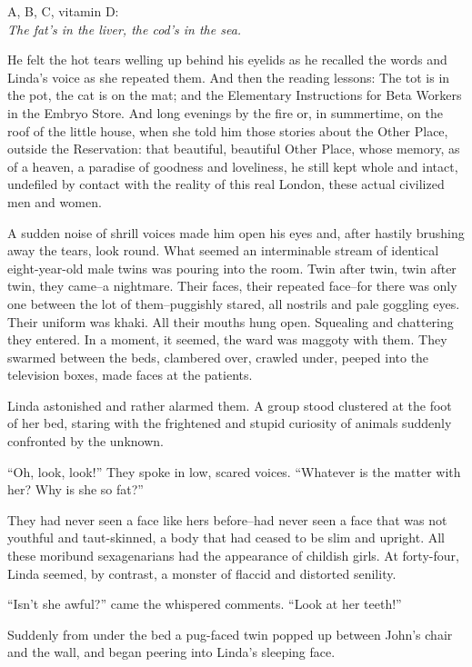 \documentclass[12pt]{report}
\begin{document}
\emph{}

A, B, C, vitamin D:\\

\emph{The fat's in the liver, the cod's in the sea.\\
}

He felt the hot tears welling up behind his eyelids as he recalled the
words and Linda's voice as she repeated them. And then the reading
lessons: The tot is in the pot, the cat is on the mat; and the
Elementary Instructions for Beta Workers in the Embryo Store. And long
evenings by the fire or, in summertime, on the roof of the little house,
when she told him those stories about the Other Place, outside the
Reservation: that beautiful, beautiful Other Place, whose memory, as of
a heaven, a paradise of goodness and loveliness, he still kept whole and
intact, undefiled by contact with the reality of this real London, these
actual civilized men and women.

A sudden noise of shrill voices made him open his eyes and, after
hastily brushing away the tears, look round. What seemed an interminable
stream of identical eight-year-old male twins was pouring into the room.
Twin after twin, twin after twin, they came--a nightmare. Their faces,
their repeated face--for there was only one between the lot of
them--puggishly stared, all nostrils and pale goggling eyes. Their
uniform was khaki. All their mouths hung open. Squealing and chattering
they entered. In a moment, it seemed, the ward was maggoty with them.
They swarmed between the beds, clambered over, crawled under, peeped
into the television boxes, made faces at the patients.

Linda astonished and rather alarmed them. A group stood clustered at the
foot of her bed, staring with the frightened and stupid curiosity of
animals suddenly confronted by the unknown.

``Oh, look, look!'' They spoke in low, scared voices. ``Whatever is the
matter with her? Why is she so fat?''

They had never seen a face like hers before--had never seen a face that
was not youthful and taut-skinned, a body that had ceased to be slim and
upright. All these moribund sexagenarians had the appearance of childish
girls. At forty-four, Linda seemed, by contrast, a monster of flaccid
and distorted senility.

``Isn't she awful?'' came the whispered comments. ``Look at her teeth!''

Suddenly from under the bed a pug-faced twin popped up between John's
chair and the wall, and began peering into Linda's sleeping face.
\end{document}
